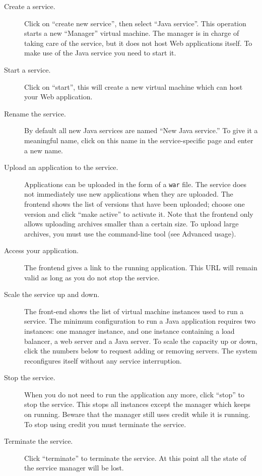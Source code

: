 \documentclass[10pt]{article}
\begin{document}
\begin{description}
\item[Create a service.] Click on ``create new service'', then select
  ``Java service''. This operation starts a new ``Manager'' virtual
  machine. The manager is in charge of taking care of the service, but
  it does not host Web applications itself. To make use of the Java
  service you need to start it.
\item[Start a service.] Click on ``start'', this will create a new
  virtual machine which can host your Web application.
\item[Rename the service.] By default all new Java services are named
  ``New Java service.'' To give it a meaningful name, click on this
  name in the service-specific page and enter a new name.
\item[Upload an application to the service.] Applications can be
  uploaded in the form of a \texttt{war} file. The service does not
  immediately use new applications when they are uploaded. The
  frontend shows the list of versions that have been uploaded; choose
  one version and click ``make active'' to activate it. Note that the
  frontend only allows uploading archives smaller than a certain size.
  To upload large archives, you must use the command-line tool (see
  Advanced usage).
\item[Access your application.] The frontend gives a link to the
  running application. This URL will remain valid as long as you do
  not stop the service.
\item[Scale the service up and down.] The front-end shows the list of
  virtual machine instances used to run a service. The minimum
  configuration to run a Java application requires two instances: one
  manager instance, and one instance containing a load balancer, a web
  server and a Java server. To scale the capacity up or down, click the
  numbers below to request adding or removing servers. The system
  reconfigures itself without any service interruption.
\item[Stop the service.] When you do not need to run the application
  any more, click ``stop'' to stop the service. This stops all
  instances except the manager which keeps on running. Beware that the
  manager still uses credit while it is running. To stop using credit
  you must terminate the service.
\item[Terminate the service.] Click ``terminate'' to terminate the
  service. At this point all the state of the service manager will be
  lost.
\end{description}
\end{document}

